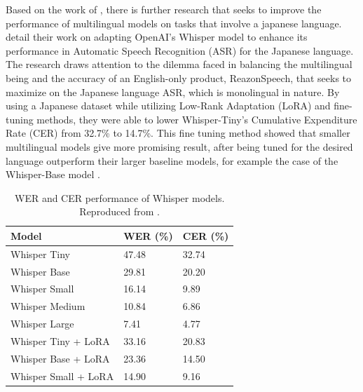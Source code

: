 Based on the work of \textcite{radford2023robust}, there is further research that seeks to improve the performance of multilingual models on tasks that involve a japanese language. \textcite{bajo2024efficient} detail their work on adapting OpenAI’s Whisper model to enhance its performance in Automatic Speech Recognition (ASR) for the Japanese language. The research draws attention to the dilemma faced in balancing the multilingual being and the accuracy of an English-only product, ReazonSpeech, that seeks to maximize on the Japanese language ASR, which is monolingual in nature. By using a Japanese dataset while utilizing Low-Rank Adaptation (LoRA) and fine-tuning methods, they were able to lower Whisper-Tiny’s Cumulative Expenditure Rate (CER) from 32.7\% to 14.7\%. This fine tuning method showed that smaller multilingual models give more promising result, after being tuned for the desired language outperform their larger baseline models, for example the case of the Whisper-Base model \parencite{bajo2024efficient}.


\begin{table}[ht]
    \centering
    \caption{WER and CER performance of Whisper models. Reproduced from \cite{bajo2024efficient}.}
    \begin{tabular}{p{4cm}|p{3cm}|p{3cm}}
    \hline
    \textbf{Model}        & \textbf{WER (\%)} & \textbf{CER (\%)} \\ \hline
    Whisper Tiny          & 47.48             & 32.74             \\ 
    Whisper Base          & 29.81             & 20.20             \\ 
    Whisper Small         & 16.14             & 9.89              \\ 
    Whisper Medium        & 10.84             & 6.86              \\ 
    Whisper Large         & 7.41              & 4.77              \\ \hline
    Whisper Tiny + LoRA   & 33.16             & 20.83             \\ 
    Whisper Base + LoRA   & 23.36             & 14.50             \\ 
    Whisper Small + LoRA  & 14.90             & 9.16              \\ \hline


    \end{tabular}
    \label{tab:whisper-performance}
    \end{table}
    
  
